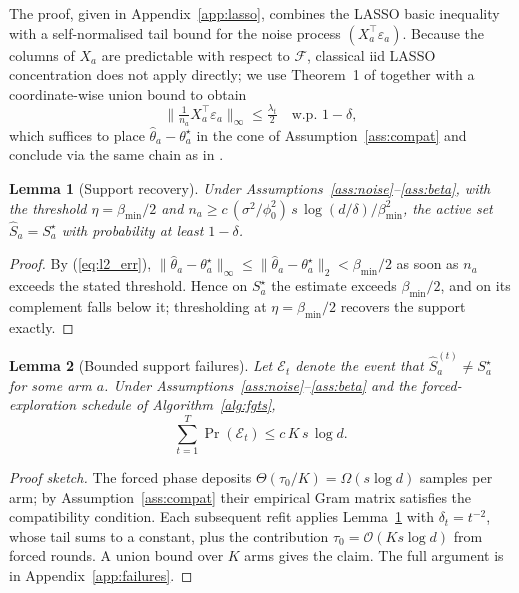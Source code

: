 \documentclass[10pt,journal,twoside,twocolumn]{IEEEtran}
\newtheorem{lemma}{Lemma}
\begin{document}
The proof, given in Appendix~\ref{app:lasso}, combines the LASSO basic inequality with a self-normalised tail bound for the noise process $(X_a^\top \varepsilon_a)$. Because the columns of $X_a$ are predictable with respect to $\mathcal{F}$, classical iid LASSO concentration does not apply directly; we use Theorem~1 of \cite{abbasi2011improved} together with a coordinate-wise union bound to obtain
\[
\Big\| \tfrac{1}{n_a} X_a^\top \varepsilon_a \Big\|_\infty \leq \tfrac{\lambda_t}{2} \quad \text{w.p. } 1 - \delta,
\]
which suffices to place $\hat\theta_a - \theta^\star_a$ in the cone of Assumption~\ref{ass:compat} and conclude via the same chain as in \cite[Thm.~6.1]{vandegeer2009conditions}.

\begin{lemma}[Support recovery]\label{lem:support}
Under Assumptions~\ref{ass:noise}--\ref{ass:beta}, with the threshold $\eta = \beta_{\min}/2$ and $n_a \geq c\,(\sigma^2/\phi_0^2)\, s\,\log(d/\delta)/\beta_{\min}^2$, the active set $\hat{S}_a = S^{\star}_a$ with probability at least $1-\delta$.
\end{lemma}

\begin{proof}
By (\ref{eq:l2_err}), $\|\hat\theta_a - \theta^{\star}_a\|_\infty \leq \|\hat\theta_a - \theta^{\star}_a\|_2 < \beta_{\min}/2$ as soon as $n_a$ exceeds the stated threshold. Hence on $S^{\star}_a$ the estimate exceeds $\beta_{\min}/2$, and on its complement falls below it; thresholding at $\eta = \beta_{\min}/2$ recovers the support exactly.
\end{proof}

\begin{lemma}[Bounded support failures]\label{lem:failures}
Let $\mathcal{E}_t$ denote the event that $\hat{S}_a^{(t)} \neq S^{\star}_a$ for some arm $a$. Under Assumptions~\ref{ass:noise}--\ref{ass:beta} and the forced-exploration schedule of Algorithm~\ref{alg:fgts},
\[
\sum_{t=1}^T \Pr(\mathcal{E}_t) \leq c\,K\,s\,\log d.
\]
\end{lemma}

\begin{proof}[Proof sketch]
The forced phase deposits $\Theta(\tau_0/K) = \Omega(s\log d)$ samples per arm; by Assumption~\ref{ass:compat} their empirical Gram matrix satisfies the compatibility condition. Each subsequent refit applies Lemma~\ref{lem:support} with $\delta_t = t^{-2}$, whose tail sums to a constant, plus the contribution $\tau_0 = \mathcal{O}(Ks\log d)$ from forced rounds. A union bound over $K$ arms gives the claim. The full argument is in Appendix~\ref{app:failures}.
\end{proof}
\end{document}
